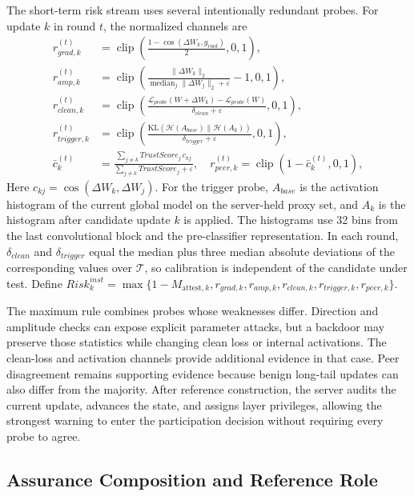 \documentclass[runningheads,orivec]{llncs}
\begin{document}
The short-term risk stream uses several intentionally redundant probes. For update $k$ in round $t$, the normalized channels are
\begin{align}
 r_{grad,k}^{(t)}&=\operatorname{clip}\!\left(\frac{1-\cos(\Delta W_k,g_{root})}{2},0,1\right),\\
 r_{amp,k}^{(t)}&=\operatorname{clip}\!\left(\frac{\|\Delta W_k\|_2}{\operatorname{median}_j\|\Delta W_j\|_2+\varepsilon}-1,0,1\right),\\
 r_{clean,k}^{(t)}&=\operatorname{clip}\!\left(\frac{\mathcal{L}_{probe}(W+\Delta W_k)-\mathcal{L}_{probe}(W)}{\delta_{clean}+\varepsilon},0,1\right),\\
 r_{trigger,k}^{(t)}&=\operatorname{clip}\!\left(\frac{\mathrm{KL}(\mathcal{H}(A_{base})\|\mathcal{H}(A_k))}{\delta_{trigger}+\varepsilon},0,1\right),\\
 \bar c_k^{(t)}&=\frac{\sum_{j\ne k}TrustScore_j\,c_{kj}}{\sum_{j\ne k}TrustScore_j+\varepsilon},\quad
 r_{peer,k}^{(t)}=\operatorname{clip}(1-\bar c_k^{(t)},0,1),
\end{align}
Here $c_{kj}=\cos(\Delta W_k,\Delta W_j)$. For the trigger probe, $A_{base}$ is the activation histogram of the current global model on the server-held proxy set, and $A_k$ is the histogram after candidate update $k$ is applied. The histograms use 32 bins from the last convolutional block and the pre-classifier representation. In each round, $\delta_{clean}$ and $\delta_{trigger}$ equal the median plus three median absolute deviations of the corresponding values over $\mathcal{T}$, so calibration is independent of the candidate under test. Define $Risk_k^{inst}=\max\{1-M_{\text{attest},k},r_{grad,k},r_{amp,k},r_{clean,k},r_{trigger,k},r_{peer,k}\}$.

The maximum rule combines probes whose weaknesses differ. Direction and amplitude checks can expose explicit parameter attacks, but a backdoor may preserve those statistics while changing clean loss or internal activations. The clean-loss and activation channels provide additional evidence in that case. Peer disagreement remains supporting evidence because benign long-tail updates can also differ from the majority. After reference construction, the server audits the current update, advances the state, and assigns layer privileges, allowing the strongest warning to enter the participation decision without requiring every probe to agree.

\subsection{Assurance Composition and Reference Role}
\end{document}
